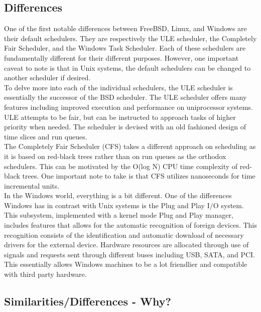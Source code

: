 \documentclass[letterpaper,10pt,titlepage]{article}
\begin{document}


\subsection{Differences}

One of the first notable differences between FreeBSD, Linux, and Windows are their default schedulers.  They are respectively the ULE scheduler, the Completely Fair Scheduler, and the Windows Task Scheduler.  Each of these schedulers are fundamentally different for their different purposes.  However, one important caveat to note is that in Unix systems, the default schedulers can be changed to another scheduler if desired.\\

To delve more into each of the individual schedulers, the ULE scheduler is essentially the successor of the BSD scheduler.  The ULE scheduler offers many features including improved execution and performance on uniprocessor systems.\cite{lkd14}  ULE attempts to be fair, but can be instructed to approach tasks of higher priority when needed.  The scheduler is devised with an old fashioned design of time slices and run queues.\\

The Completely Fair Scheduler (CFS) takes a different approach on scheduling as it is based on red-black trees rather than on run queues as the orthodox schedulers.  This can be motivated by the O(log N) CPU time complexity of red-black trees.\cite{lkd14}  One important note to take is that CFS utilizes nanoseconds for time incremental units.\\

In the Windows world, everything is a bit different.  One of the differences Windows has in contrast with Unix systems is the Plug and Play I/O system.  This subsystem, implemented with a kernel mode Plug and Play manager, includes features that allows for the automatic recognition of foreign devices.\cite{mwi8}  This recognition consists of the identification and automatic download of necessary drivers for the external device.  Hardware resources are allocated through use of signals and requests sent through different buses including USB, SATA, and PCI.  This essentially allows Windows machines to be a lot friendlier and compatible with third party hardware.\\

\subsection{Similarities/Differences - Why?}
\end{document}
